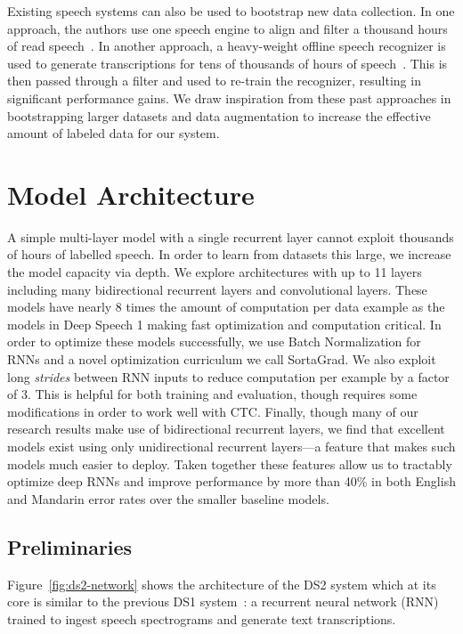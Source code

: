 \documentclass{article}
\begin{document}
Existing speech systems can also be used to bootstrap new data collection. In one approach, the authors use one speech engine to align and filter a thousand hours of read speech~\cite{panayotov2015}. In another approach, a heavy-weight offline speech recognizer is used to generate transcriptions for tens of thousands of hours of speech~\cite{kapralove2014}. This is then passed through a filter and used to re-train the recognizer, resulting in significant performance gains. We draw inspiration from these past approaches in bootstrapping larger datasets and data augmentation to increase the effective amount of labeled data for our system.


\section{Model Architecture}
\label{section:model}

A simple multi-layer model with a single recurrent layer cannot exploit thousands of hours of labelled speech. In order to learn from datasets this large, we increase the model capacity via depth. We explore architectures with up to 11 layers including many bidirectional recurrent layers and convolutional layers. These models have nearly 8 times the amount of computation per data example as the models in Deep Speech 1 making fast optimization and computation critical. In order to optimize these models successfully, we use Batch Normalization for RNNs and a novel optimization curriculum we call SortaGrad. We also exploit long \emph{strides} between RNN inputs to reduce computation per example by a factor of 3. This is helpful for both training and evaluation, though requires some modifications in order to work well with CTC. Finally, though many of our research results make use of bidirectional recurrent layers, we find that excellent models exist using only unidirectional recurrent layers---a feature that makes such models much easier to deploy.  Taken together these features allow us to tractably optimize deep RNNs and improve performance by more than 40\% in both English and Mandarin error rates over the smaller baseline models.

\subsection{Preliminaries}

Figure~\ref{fig:ds2-network} shows the architecture of the DS2 system which at its core is similar to the previous DS1 system~\cite{hannun2014deepspeech}: a recurrent neural network (RNN) trained to ingest speech spectrograms and generate text transcriptions. 
\end{document}
